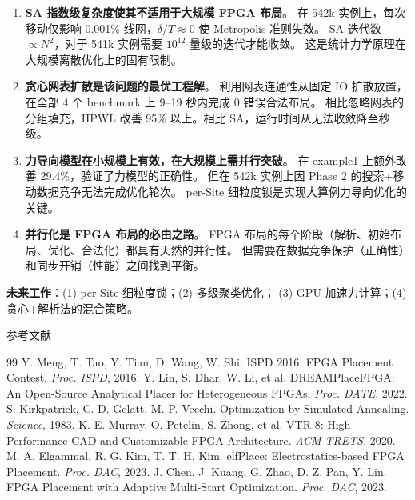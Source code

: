 \documentclass[10.5pt,compsoc]{CjC}
\theoremstyle{mystyle}
\begin{document}
\begin{enumerate}
\item \textbf{SA 指数级复杂度使其不适用于大规模 FPGA 布局}。
在 542k 实例上，每次移动仅影响 0.001\% 线网，$\delta/T \approx 0$ 使 Metropolis 准则失效。
SA 迭代数 $\propto N^2$，对于 541k 实例需要 $10^{12}$ 量级的迭代才能收敛。
这是统计力学原理在大规模离散优化上的固有限制。

\item \textbf{贪心网表扩散是该问题的最优工程解}。
利用网表连通性从固定 IO 扩散放置，在全部 4 个 benchmark 上 9--19 秒内完成 0 错误合法布局。
相比忽略网表的分组填充，HPWL 改善 95\% 以上。相比 SA，运行时间从无法收敛降至秒级。

\item \textbf{力导向模型在小规模上有效，在大规模上需并行突破}。
在 example1 上额外改善 29.4\%，验证了力模型的正确性。
但在 542k 实例上因 Phase 2 的搜索+移动数据竞争无法完成优化轮次。
per-Site 细粒度锁是实现大算例力导向优化的关键。

\item \textbf{并行化是 FPGA 布局的必由之路}。
FPGA 布局的每个阶段（解析、初始布局、优化、合法化）都具有天然的并行性。
但需要在数据竞争保护（正确性）和同步开销（性能）之间找到平衡。
\end{enumerate}

\textbf{未来工作}：(1) per-Site 细粒度锁；(2) 多级聚类优化；
(3) GPU 加速力计算；(4) 贪心+解析法的混合策略。

\vspace{3mm}
\vspace{5mm}

\centerline{\heiti 参考文献}

\begin{thebibliography}{99}
 \addtolength{\itemsep}{-1em}
 Y. Meng, T. Tao, Y. Tian, D. Wang, W. Shi. ISPD 2016: FPGA Placement Contest. \textit{Proc. ISPD}, 2016.
 Y. Lin, S. Dhar, W. Li, et al. DREAMPlaceFPGA: An Open-Source Analytical Placer for Heterogeneous FPGAs. \textit{Proc. DATE}, 2022.
 S. Kirkpatrick, C. D. Gelatt, M. P. Vecchi. Optimization by Simulated Annealing. \textit{Science}, 1983.
 K. E. Murray, O. Petelin, S. Zhong, et al. VTR 8: High-Performance CAD and Customizable FPGA Architecture. \textit{ACM TRETS}, 2020.
 M. A. Elgammal, R. G. Kim, T. T. H. Kim. elfPlace: Electrostatics-based FPGA Placement. \textit{Proc. DAC}, 2023.
 J. Chen, J. Kuang, G. Zhao, D. Z. Pan, Y. Lin. FPGA Placement with Adaptive Multi-Start Optimization. \textit{Proc. DAC}, 2023.
\end{thebibliography}
\end{document}
